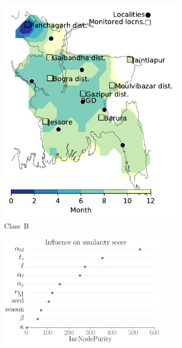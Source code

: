 \documentclass[11pt]{article}
\newcommand{\ald}{\alpha_{\ell d}}
\theoremstyle{definition}
\begin{document}
\begin{figure}[t]
\begin{subfigure}[b]{.3\textwidth}
    \includegraphics[width=\textwidth]{BGD_model-B_m1_l3.pdf}
    \caption{Class~B \label{fig:bgdClassB1}} %
\end{subfigure}
\begin{subfigure}[b]{.32\textwidth}
    \centering
    \includegraphics[width=0.9\textwidth]{rf_importance_all_mdi.pdf}

\end{subfigure}
\end{figure}
\end{document}
